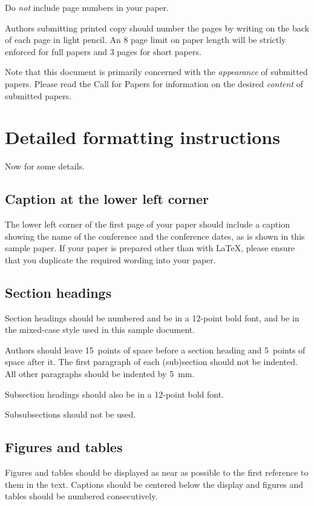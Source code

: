\documentclass[twocolumn]{article}
\begin{document}
Do \emph{not} include page numbers in your paper.

Authors submitting printed copy should number the pages by writing on
the back of each page in light pencil.  An 8 page limit on paper
length will be strictly enforced for full papers and 3 pages for short
papers.

Note that this document is primarily concerned with the
\emph{appearance} of submitted papers.  Please read the Call for
Papers for information on the desired \emph{content} of submitted
papers.


\section{Detailed formatting instructions}

Now for some details.

\subsection{Caption at the lower left corner}

The lower left corner of the first page of your paper should include a
caption showing the name of the conference and the conference dates,
as is shown in this sample paper.  If your paper is prepared other
than with {\LaTeX}, please ensure that you duplicate the required
wording into your paper.


\subsection{Section headings}

Section headings should be numbered and be in a 12-point bold
font, and be in the mixed-case style used in this sample document.

Authors should leave 15~points of space before a section heading and
5~points of space after it.  The first paragraph of each (sub)section
should not be indented.  All other paragraphs should be indented by
5~mm.

Subsection headings should also be in a 12-point bold font.

Subsubsections should not be used.

\subsection{Figures and tables}

Figures and tables should be displayed as near as possible to the
first reference to them in the text.  Captions should be centered
below the display and figures and tables should be numbered
consecutively.
\end{document}
